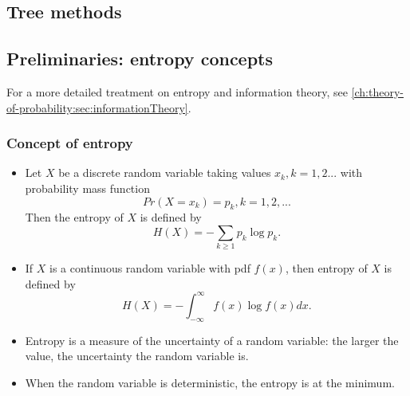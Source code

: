 \begin{refsection}
	\startcontents[chapters]	
	\chapter{Tree methods}\label{ch:StatisticalLearning:TreeMethods}



\section{Preliminaries: entropy concepts}

For a more detailed treatment on entropy and information theory, see \autoref{ch:theory-of-probability:sec:informationTheory}.

\subsection{Concept of entropy}

\begin{definition}\hfill
	\begin{itemize}
		\item 	Let $X$ be a discrete random variable taking values $x_k,k=1,2...$ with probability mass function 
		$$Pr(X = x_k) = p_k, k=1,2,...$$ 
		Then the entropy of $X$ is defined by
		$$H(X) = - \sum_{k\geq 1}p_k\log p_k.$$
		\item If $X$ is a continuous random variable with pdf $f(x)$, then entropy of $X$ is defined by
		$$H(X) = -\int_{-\infty}^{\infty} f(x)\log f(x) dx.$$
	\end{itemize}	
	
\end{definition}

\begin{remark}\hfill
	\begin{itemize}
		\item Entropy is a measure of the uncertainty of a random variable: the larger the value, the uncertainty the random variable is.
		\item When the random variable is deterministic, the entropy is at the minimum.
	\end{itemize}	
\end{remark}



\end{refsection}

